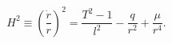 \begin{equation}
H^2 \equiv \left(\frac{\dot r}{r}\right)^2 
= \frac{T^2-1}{l^2}-\frac{q}{r^2}+\frac{\mu}{r^4}.
\end{equation}

